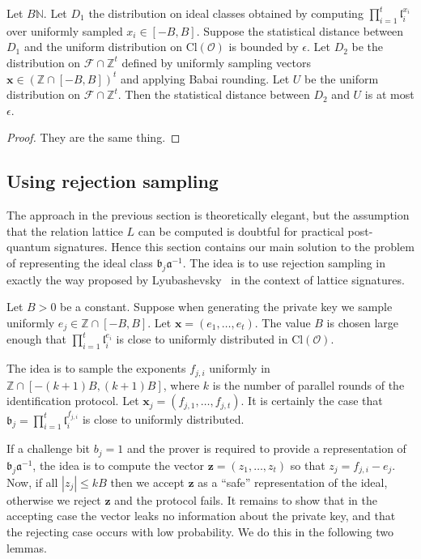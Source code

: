 \documentclass{llncs}
\newcommand{\FF}{\mathcal{F}}
\newcommand{\N}{\mathbb{N}}
\newcommand{\OO}{\mathcal{O}}
\newcommand{\Z}{\mathbb{Z}}
\newcommand{\Cl}{\text{Cl}}
\renewcommand{\a}{\mathfrak{a}}
\renewcommand{\b}{\mathfrak{b}}
\renewcommand{\l}{\mathfrak{l}}
\newcommand{\e}{\textbf{x}}
\newcommand{\f}{\textbf{x}}
\newcommand{\x}{\textbf{x}}
\newcommand{\z}{\textbf{z}}
\begin{document}
\begin{lemma} \label{lem:sim1}
Let $B \N$. Let $D_1$ the distribution on ideal classes obtained by computing $\prod_{i=1}^t \l_i^{x_i}$ over uniformly sampled $x_i \in [-B,B]$.
Suppose the statistical distance between $D_1$ and the uniform distribution on $\Cl(\OO)$ is bounded by $\epsilon$.
Let $D_2$ be the distribution on $\FF \cap \Z^t$ defined by uniformly sampling vectors $\x \in (\Z \cap [-B,B])^t$ and applying Babai rounding.
Let $U$ be the uniform distribution on $\FF \cap \Z^t$.
Then the statistical distance between $D_2$ and $U$ is at most $\epsilon$.
\end{lemma}

\begin{proof}
They are the same thing.
\end{proof}




\subsection{Using rejection sampling}

The approach in the previous section is theoretically elegant, but the assumption that the relation lattice $L$ can be computed is doubtful for practical post-quantum signatures.
Hence this section contains our main solution to the problem of representing the ideal class $\b_j \a^{-1}$.
The idea is to use rejection sampling in exactly the way proposed by Lyubashevsky~\cite{Lyu09} in the context of lattice signatures.

Let $B > 0$ be a constant. Suppose when generating the private key we sample uniformly $e_j \in \Z \cap [-B, B]$. Let $\e = ( e_1, \dots, e_t )$.
The value $B$ is chosen large enough that $\prod_{i=1}^t \l_i^{e_i}$ is close to uniformly distributed in $\Cl(\OO)$.

The idea is to sample the exponents $ f_{j,i} $ uniformly in $\Z \cap [-(k+1)B, (k+1)B]$, where $k$ is the number of parallel rounds of the identification protocol.
Let $\f_j = (f_{j,1}, \dots, f_{j,t} )$.
It is certainly the case that $\b_j = \prod_{i=1}^t \l_i^{f_{j,i}}$ is close to uniformly distributed.

If a challenge bit $b_j = 1$ and the prover is required to provide a representation of $\b_j \a^{-1}$, the idea is to compute the vector $\z = (z_1, \dots, z_t) $ so that $z_j = f_{j,i} - e_j $.
Now, if all $|z_j| \le kB$ then we accept $\z$ as a ``safe'' representation of the ideal, otherwise we reject $\z$ and the protocol fails.
It remains to show that in the accepting case the vector leaks no information about the private key, and that the rejecting case occurs with low probability. We do this in the following two lemmas.
\end{document}
